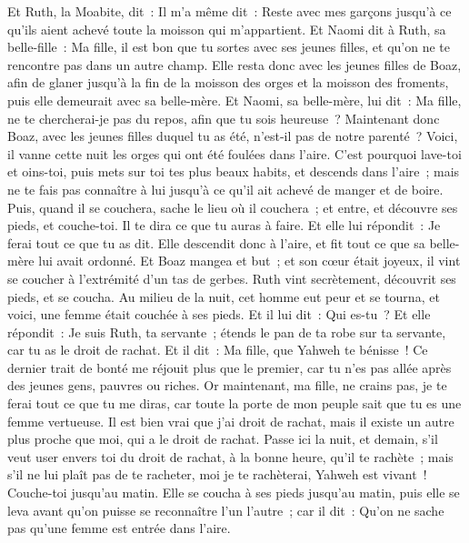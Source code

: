 \begin{multicols}{2}
Et Ruth, la Moabite, dit~: Il m'a même dit~: Reste avec mes garçons jusqu'à ce qu'ils aient achevé toute la moisson qui m'appartient.
Et Naomi dit à Ruth, sa belle-fille~: Ma fille, il est bon que tu sortes avec ses jeunes filles, et qu'on ne te rencontre pas dans un autre champ.
Elle resta donc avec les jeunes filles de Boaz, afin de glaner jusqu'à la fin de la moisson des orges et la moisson des froments, puis elle demeurait avec sa belle-mère.
\VerseOne{}Et Naomi, sa belle-mère, lui dit~: Ma fille, ne te chercherai-je pas du repos, afin que tu sois heureuse~?
Maintenant donc Boaz, avec les jeunes filles duquel tu as été, n'est-il pas de notre parenté~? Voici, il vanne cette nuit les orges qui ont été foulées dans l'aire.
C'est pourquoi lave-toi et oins-toi, puis mets sur toi tes plus beaux habits, et descends dans l'aire~; mais ne te fais pas connaître à lui jusqu'à ce qu'il ait achevé de manger et de boire.
Puis, quand il se couchera, sache le lieu où il couchera~; et entre, et découvre ses pieds, et couche-toi. Il te dira ce que tu auras à faire.
Et elle lui répondit~: Je ferai tout ce que tu as dit.
Elle descendit donc à l'aire, et fit tout ce que sa belle-mère lui avait ordonné.
Et Boaz mangea et but~; et son cœur était joyeux, il vint se coucher à l'extrémité d'un tas de gerbes. Ruth vint secrètement, découvrit ses pieds, et se coucha.
Au milieu de la nuit, cet homme eut peur et se tourna, et voici, une femme était couchée à ses pieds.
Et il lui dit~: Qui es-tu~? Et elle répondit~: Je suis Ruth, ta servante~; étends le pan de ta robe sur ta servante, car tu as le droit de rachat.
Et il dit~: Ma fille, que Yahweh te bénisse~! Ce dernier trait de bonté me réjouit plus que le premier, car tu n'es pas allée après des jeunes gens, pauvres ou riches.
Or maintenant, ma fille, ne crains pas, je te ferai tout ce que tu me diras, car toute la porte de mon peuple sait que tu es une femme vertueuse.
Il est bien vrai que j'ai droit de rachat, mais il existe un autre plus proche que moi, qui a le droit de rachat.
Passe ici la nuit, et demain, s'il veut user envers toi du droit de rachat, à la bonne heure, qu'il te rachète~; mais s'il ne lui plaît pas de te racheter, moi je te rachèterai, Yahweh est vivant~! Couche-toi jusqu'au matin.
Elle se coucha à ses pieds jusqu'au matin, puis elle se leva avant qu'on puisse se reconnaître l'un l'autre~; car il dit~: Qu'on ne sache pas qu'une femme est entrée dans l'aire.

\end{multicols}
